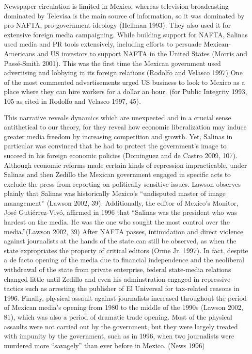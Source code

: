 \documentclass[a4paper]{article}\usepackage[]{graphicx}\usepackage[]{color}
\begin{document}
Newspaper circulation is limited in Mexico, whereas television broadcasting dominated by Televisa is the main source of information, so it was dominated by pro-NAFTA, pro-government ideology (Hellman 1993). They also used it for extensive foreign media campaigning. While building support for NAFTA, Salinas used media and PR tools extensively, including efforts to persuade Mexican-Americans and US investors to support NAFTA in the United States (Morris and Passé-Smith 2001). This was the first time the Mexican government used advertising and lobbying in its foreign relations (Rodolfo and Velasco 1997) One of the most commented advertisements urged US business to look to Mexico as a place where they can hire workers for a dollar an hour. (for Public Integrity 1993, 105 as cited in Rodolfo and Velasco 1997, 45).

This narrative reveals dynamics which are unexpected and in a crucial sense antithetical to our theory, for they reveal how economic liberalization may induce greater media freedom by increasing competition and growth. Yet, Salinas in particular was convinced that he had to protect the government's image to succeed in his foreign economic policies (Dominguez and de Castro 2009, 107). Although economic reforms made certain kinds of repression impracticable, under Salinas and then Zedillo the Mexican government engaged in specific acts to exclude the press from reporting on politically sensitive issues. Lawson observes plainly that Salinas was historically Mexico's “undisputed master of image management” (Lawson 2002, 39). Additionally, the editor of Mexico's Monitor, José Gutiérrez-Vivó, affirmed in 1996 that “Salinas was the president who was hardest on the media. He was the one who sought the most control over the media.”(Lawson 2002, 39) After NAFTA passes, intimidation and direct violence against journalists at the hands of the state can still be observed, as when the state expropriates the property of critical editors (Orme Jr. 1997). In fact, despite a de facto opening of the media due to financial independence and the neoliberal withdrawal of the state from private enterprise, federal state-media relations changed little until Zedillo and even his adminstration engaged in repressive tactics such as arresting the publisher of El Universal for tax-related reasons in 1996. Finally, physical assault against journalists increased throughout the period of Mexican media's opening from 1980 to the middle of the 1990s (Lawson 2002, 81), which was also a period of dramatic trade opening. Most of the physical assaults were not carried out by the government, but they were largely treated with impunity by the government, such as in 1996, when two journalists were murdered more “savagely” than ever before in Mexico. (News 1996)
\end{document}
